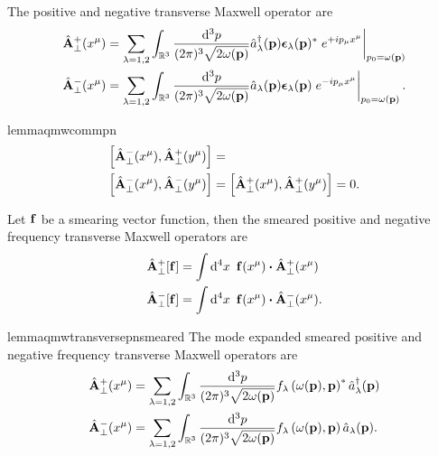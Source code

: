 \begin{definition}\label{thm:qmw_transverse_pn}
	The positive and negative transverse Maxwell operator are
	\begin{align}
		\label{eq:qmw_transverse_pn}
		\hat{\vb{A}}^+_\perp(x^\mu)
		&=
		\sum_{\lambda=1,2}
		\int_{\mathbb{R}^3}\frac{\dd[3]{p}}{(2\pi)^3\sqrt{2\omega(\vb{p})}}
		\hat{a}_\lambda^\dagger(\vb{p})
		\boldsymbol{\epsilon}_\lambda(\vb{p})^*
		\eval{e^{+ip_\mu x^\mu}}_{p_0=\omega(\vb{p})}
		\\
		\hat{\vb{A}}^-_\perp(x^\mu)
		&=
		\sum_{\lambda=1,2}
		\int_{\mathbb{R}^3}\frac{\dd[3]{p}}{(2\pi)^3\sqrt{2\omega(\vb{p})}}
		\hat{a}_\lambda(\vb{p})
		\boldsymbol{\epsilon}_\lambda(\vb{p})
		\eval{e^{-ip_\mu x^\mu}}_{p_0=\omega(\vb{p})}
		.
	\end{align}
\end{definition}
\begin{restatable}{lemma}{qmwcommpn}\label{thm:qmw_comm_pn}
	\begin{align}
		\label{eq:qmw_comm_ac}
		\comm{\hat{\vb{A}}_\perp^-(x^\mu)}{\hat{\vb{A}}_\perp^+(y^\mu)}
		&=
		\\
		\comm{\hat{\vb{A}}_\perp^-(x^\mu)}{\hat{\vb{A}}_\perp^-(y^\mu)}
		&=
		\comm{\hat{\vb{A}}_\perp^+(x^\mu)}{\hat{\vb{A}}_\perp^+(y^\mu)}
		=
		0
		.
	\end{align}
\end{restatable}

\begin{definition}\label{def:qmw_transverse_pn_smeared}
	Let $\vb{f}$ be a smearing vector function, then the smeared positive and negative frequency transverse Maxwell operators are
	\begin{align}
		\label{eq:qmw_transverse_pn_smeared}
		\hat{\vb{A}}_\perp^+[\vb{f}]
		&=
		\int\dd[4]{x}\
		\vb{f}(x^\mu)
		\vdot
		\hat{\vb{A}}_\perp^+(x^\mu)
		\\
		\hat{\vb{A}}_\perp^-[\vb{f}]
		&=
		\int\dd[4]{x}\
		\vb{f}(x^\mu)
		\vdot
		\hat{\vb{A}}_\perp^-(x^\mu)
		.
	\end{align}
\end{definition}
\begin{restatable}{lemma}{qmwtransversepnsmeared}\label{thm:qmw_transverse_pn_smeared}
	The mode expanded smeared positive and negative frequency transverse Maxwell operators are
	\begin{align}
		\label{eq:qmw_transverse_pn}
		\hat{\vb{A}}^+_\perp(x^\mu)
		&=
		\sum_{\lambda=1,2}
		\int_{\mathbb{R}^3}\frac{\dd[3]{p}}{(2\pi)^3\sqrt{2\omega(\vb{p})}}
		f_\lambda\left(\omega(\vb{p}),\vb{p}\right)^*
		\hat{a}_\lambda^\dagger(\vb{p})
		\\
		\hat{\vb{A}}^-_\perp(x^\mu)
		&=
		\sum_{\lambda=1,2}
		\int_{\mathbb{R}^3}\frac{\dd[3]{p}}{(2\pi)^3\sqrt{2\omega(\vb{p})}}
		f_\lambda\left(\omega(\vb{p}),\vb{p}\right)
		\hat{a}_\lambda(\vb{p})
		.
	\end{align}	
\end{restatable}
